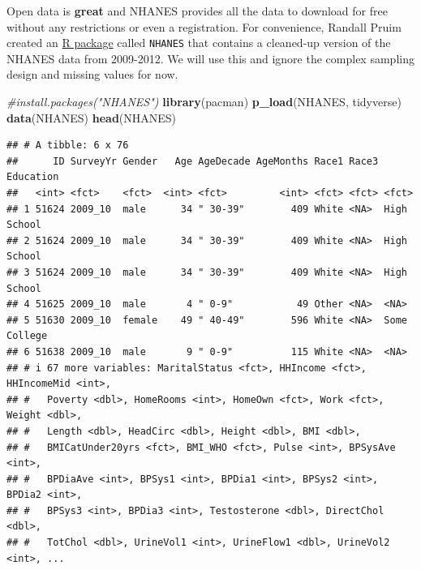 \documentclass[
]{book}
\newenvironment{Shaded}{\begin{snugshade}}{\end{snugshade}}
\newcommand{\CommentTok}[1]{\textcolor[rgb]{0.56,0.35,0.01}{\textit{#1}}}
\newcommand{\FunctionTok}[1]{\textcolor[rgb]{0.13,0.29,0.53}{\textbf{#1}}}
\newcommand{\NormalTok}[1]{#1}
\newcommand{\SpecialCharTok}[1]{\textcolor[rgb]{0.81,0.36,0.00}{\textbf{#1}}}
\begin{document}
Open data is \textbf{great} and NHANES provides all the data to download for free
without any restrictions or even a registration. For convenience, Randall Pruim
created an \href{https://cran.r-project.org/web/packages/NHANES/NHANES.pdf}{R package}
called \texttt{NHANES} that contains a cleaned-up version of the
NHANES data from 2009-2012. We will use this and ignore the complex sampling
design and missing values for now.

\begin{Shaded}
\begin{Highlighting}[]
\CommentTok{\#install.packages("NHANES")}
\FunctionTok{library}\NormalTok{(pacman)}
\FunctionTok{p\_load}\NormalTok{(NHANES, tidyverse)}
\FunctionTok{data}\NormalTok{(NHANES)}
\FunctionTok{head}\NormalTok{(NHANES)}
\end{Highlighting}
\end{Shaded}

\begin{verbatim}
## # A tibble: 6 x 76
##      ID SurveyYr Gender   Age AgeDecade AgeMonths Race1 Race3 Education   
##   <int> <fct>    <fct>  <int> <fct>         <int> <fct> <fct> <fct>       
## 1 51624 2009_10  male      34 " 30-39"        409 White <NA>  High School 
## 2 51624 2009_10  male      34 " 30-39"        409 White <NA>  High School 
## 3 51624 2009_10  male      34 " 30-39"        409 White <NA>  High School 
## 4 51625 2009_10  male       4 " 0-9"           49 Other <NA>  <NA>        
## 5 51630 2009_10  female    49 " 40-49"        596 White <NA>  Some College
## 6 51638 2009_10  male       9 " 0-9"          115 White <NA>  <NA>        
## # i 67 more variables: MaritalStatus <fct>, HHIncome <fct>, HHIncomeMid <int>,
## #   Poverty <dbl>, HomeRooms <int>, HomeOwn <fct>, Work <fct>, Weight <dbl>,
## #   Length <dbl>, HeadCirc <dbl>, Height <dbl>, BMI <dbl>,
## #   BMICatUnder20yrs <fct>, BMI_WHO <fct>, Pulse <int>, BPSysAve <int>,
## #   BPDiaAve <int>, BPSys1 <int>, BPDia1 <int>, BPSys2 <int>, BPDia2 <int>,
## #   BPSys3 <int>, BPDia3 <int>, Testosterone <dbl>, DirectChol <dbl>,
## #   TotChol <dbl>, UrineVol1 <int>, UrineFlow1 <dbl>, UrineVol2 <int>, ...
\end{verbatim}

\begin{Shaded}
\end{Shaded}
\end{document}
